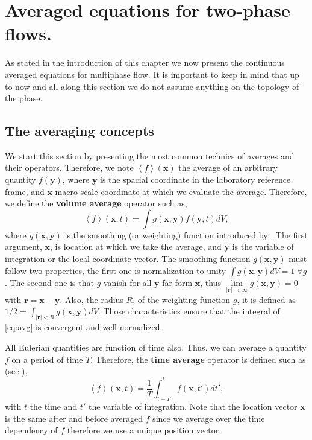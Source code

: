 
\section{Averaged equations for two-phase flows.}
\label{sec:introavg}

As stated in the introduction of this chapter we now present the continuous averaged equations for multiphase flow. 
It is important to keep in mind that up to now and all along this section we do not assume anything on the topology of the phase.


\subsection{The averaging concepts}

We start this section by presenting the most common technics of averages and their operators. 
Therefore, we note $\left<f\right>(\textbf{x})$ the average of an arbitrary quantity $f(\textbf{y})$, 
where $\textbf{y}$ is the spacial coordinate in the laboratory reference frame, 
and $\textbf{x}$ macro scale coordinate at which we evaluate the average.
Therefore, we define the \textbf{volume average} operator such as,
\begin{equation}
    \left<f\right>(\textbf{x},t) = \int g(\textbf{x},\textbf{y}) f(\textbf{y},t)dV,
    \label{eq:avg}
\end{equation}
where $g(\textbf{x},\textbf{y})$ is the smoothing (or weighting) function introduced by 
\citet{jackson1997locally,marle1982macroscopic}.
The first argument, $\textbf{x}$, is location at which we take the average, and \textbf{y} is the variable of integration or the local coordinate vector.
The smoothing function $g(\textbf{x},\textbf{y})$ must follow two properties, the first one is normalization to unity 
$\int g(\textbf{x},\textbf{y}) dV = 1 \;\forall g$.
The second one is that $g$ vanish for all $\textbf{y}$ far form $\textbf{x}$, thus $\lim\limits_{|\textbf{r}| \to \infty} g(\textbf{x},\textbf{y}) = 0$ with $\textbf{r} = \textbf{x} - \textbf{y}$.
Also, the radius $R$, of the weighting function $g$, it is defined as $1/2 = \int_{|\textbf{r}|<R} g(\textbf{x},\textbf{y})dV$.
Those characteristics ensure that the integral of \ref{eq:avg} is convergent and well normalized. 

All Eulerian quantities are function of time also. 
Thus, we can average a quantity $f$ on a period of time $T$. 
Therefore, the \textbf{time average} operator is defined such as (see \citet{morel2015mathematical,drew1983mathematical,ishii2010thermo}), 
\begin{equation*}
    \left<f\right>(\textbf{x},t) = \frac{1}{T}\int_{t-T}^t f(\textbf{x},t')dt',
\end{equation*}
with $t$ the time and $t'$ the variable of integration.
Note that the location vector \textbf{x} is the same after and before averaged $f$ since we average over the time dependency of $f$ therefore we use a unique position vector.  

